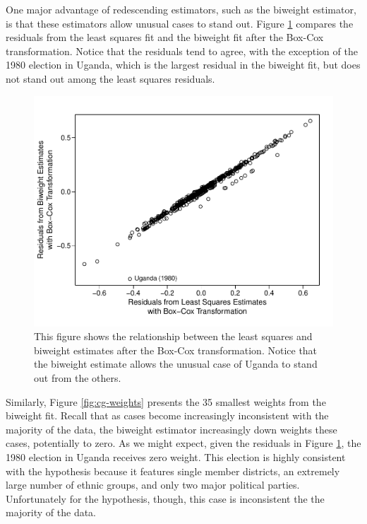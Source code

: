 \documentclass[12pt]{article}
\begin{document}
One major advantage of redescending estimators, such as the biweight estimator, is that these estimators allow unusual cases to stand out. Figure \ref{fig:cg-residuals-compare} compares the residuals from the least squares fit and the biweight fit after the Box-Cox transformation. Notice that the residuals tend to agree, with the exception of the 1980 election in Uganda, which is the largest residual in the biweight fit, but does not stand out among the least squares residuals.

\begin{figure}[H]
\begin{center}
\includegraphics[scale = 0.8]{figs/cg-residuals-compare.pdf}
\caption{This figure shows the relationship between the least squares and biweight estimates after the Box-Cox transformation. Notice that the biweight estimate allows the unusual case of Uganda to stand out from the others.}\label{fig:cg-residuals-compare}
\end{center}
\end{figure}

Similarly, Figure \ref{fig:cg-weights} presents the 35 smallest weights from the biweight fit. Recall that as cases become increasingly inconsistent with the majority of the data, the biweight estimator increasingly down weights these cases, potentially to zero. As we might expect, given the residuals in Figure \ref{fig:cg-residuals-compare}, the 1980 election in Uganda receives zero weight. This election is highly consistent with the hypothesis because it features single member districts, an extremely large number of ethnic groups, and only two major political parties. Unfortunately for the hypothesis, though, this case is inconsistent the the majority of the data.
\end{document}
